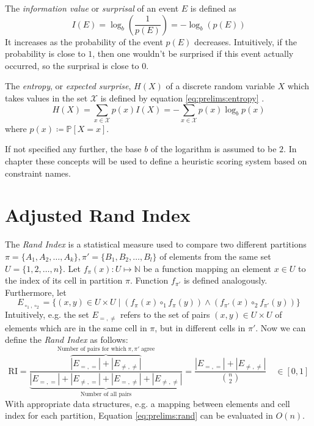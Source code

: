 		The \textit{information value} or \textit{surprisal} of an event $E$ is defined as
		\begin{equation}
			I(E) = \log_b \left( \frac{1}{p(E)} \right) = - \log_b \left( p(E) \right)
		\end{equation}
		It increases as the probability of the event $p(E)$ decreases.
		Intuitively, if the probability is close to $1$, then one wouldn't be surprised if this event actually occurred, so the surprisal is close to $0$.
		
		The \textit{entropy}, or \textit{expected surprise}, $H(X)$ of a discrete random variable $X$ which takes values in the set $\mathcal{X}$ is defined by equation \ref{eq:prelims:entropy} \cite{coverElementsInformationTheory2006}.
		\begin{equation}
		\label{eq:prelims:entropy}
			H(X) =  \sum_{x \in \mathcal{X}} p(x) I(X) = - \sum_{x \in \mathcal{X}} p(x) \log_b p(x)
		\end{equation}
		where $p(x) \coloneq \mathbb{P}[X = x]$.
		
		If not specified any further, the base $b$ of the logarithm is assumed to be $2$.
		In chapter  these concepts will be used to define a heuristic scoring system based on constraint names.
		
	\section{Adjusted Rand Index}
	
		The \textit{Rand Index} is a statistical measure used to compare two different partitions $\pi = \{ A_1, A_2, \ldots, A_k \}, \pi' = \{ B_1, B_2, \ldots, B_l \}$ of elements from the same set $U = \{ 1, 2, \ldots, n \}$.
		Let $f_\pi(x): U \mapsto \mathbb{N}$ be a function mapping an element $x \in U$ to the index of its cell in partition $\pi$. Function $f_{\pi'}$ is defined analogously.
		Furthermore, let
		\begin{equation*}
			E_{\circ_1, \circ_2} = \{ (x, y) \in U \times U \mid (f_\pi(x) \circ_1 f_\pi(y)) \land (f_{\pi'}(x) \circ_2 f_{\pi'}(y)) \}
		\end{equation*}
		Intuitively, e.g. the set $E_{=, \not=}$ refers to the set of pairs $(x, y) \in U \times U$ of elements which are in the same cell in $\pi$, but in different cells in $\pi'$.
		Now we can define the \textit{Rand Index} as follows:
		\begin{equation}
			\label{eq:prelims:rand}
			\mathrm{RI} = \frac{\overbrace{|E_{=, =}| + |E_{\not=, \not=}|}^{\text{Number of pairs for which}\; \pi, \pi' \;\text{agree}}}{\underbrace{|E_{=, =}| + |E_{\not=, =}| + |E_{=, \not=}| + |E_{\not=, \not=}|}_{\text{Number of all pairs}}} = \frac{|E_{=, =}| + |E_{\not=, \not=}|}{\binom{n}{2}} \quad \in [0, 1]
		\end{equation}
		With appropriate data structures, e.g. a mapping between elements and cell index for each partition, Equation \ref{eq:prelims:rand} can be evaluated in $O(n)$.
		
